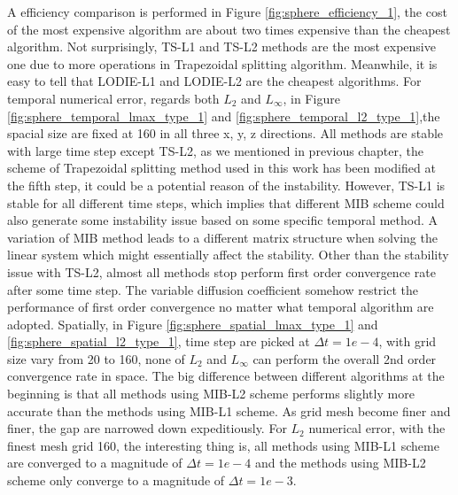 \documentclass[dissertation]{uathesis}
\begin{document}
\begin{body}
A efficiency comparison is performed in Figure \ref{fig:sphere_efficiency_1}, the cost of the most expensive algorithm are about two times expensive than the cheapest algorithm. Not surprisingly, TS-L1 and TS-L2 methods are the most expensive one due to more operations in Trapezoidal splitting algorithm. Meanwhile, it is easy to tell that LODIE-L1 and LODIE-L2 are the cheapest algorithms. For temporal numerical error, regards both $L_2$ and $L_{\infty}$, in Figure \ref{fig:sphere_temporal_lmax_type_1} and \ref{fig:sphere_temporal_l2_type_1},the spacial size are fixed at 160 in all three x, y, z directions. All methods are stable with large time step except TS-L2, as we mentioned in previous chapter, the scheme of Trapezoidal splitting method used in this work has been modified at the fifth step, it could be a potential reason of the instability. However, TS-L1 is stable for all different time steps, which implies that different MIB scheme could also generate some instability issue based on some specific temporal method. A variation of MIB method leads to a different matrix structure when solving the linear system which might essentially affect the stability. Other than the stability issue with TS-L2, almost all methods stop perform first order convergence rate after some time step. The variable diffusion coefficient somehow restrict the performance of first order convergence no matter what temporal algorithm are adopted. Spatially, in Figure \ref{fig:sphere_spatial_lmax_type_1} and \ref{fig:sphere_spatial_l2_type_1}, time step are picked at $\Delta{t}=1e-4$, with grid size vary from 20 to 160, none of $L_2$ and $L_{\infty}$ can perform the overall 2nd order convergence rate in space. The big difference between different algorithms at the beginning is that all methods using MIB-L2 scheme performs slightly more accurate than the methods using MIB-L1 scheme. As grid mesh become finer and finer, the gap are narrowed down expeditiously. For $L_2$ numerical error, with the finest mesh grid 160, the interesting thing is, all methods using MIB-L1 scheme are converged to a magnitude of $\Delta{t}=1e-4$ and the methods using MIB-L2 scheme only converge to a magnitude of $\Delta{t}=1e-3$.




\end{body}
\end{document}
